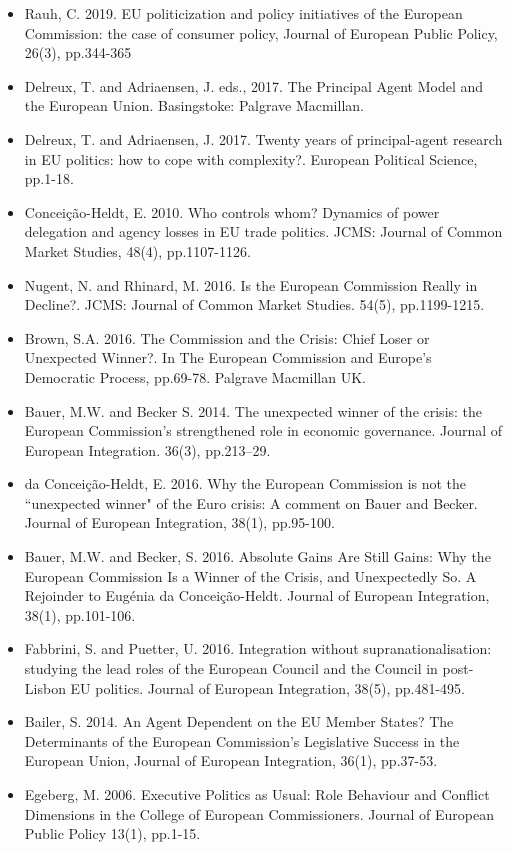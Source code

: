 \begin{itemize}
	\item Rauh, C. 2019. EU politicization and policy initiatives of the European Commission: the case of consumer policy, Journal of European Public Policy, 26(3), pp.344-365
	\item Delreux, T. and Adriaensen, J. eds., 2017. The Principal Agent Model and the European Union. Basingstoke: Palgrave Macmillan.
	\item Delreux, T. and Adriaensen, J. 2017. Twenty years of principal-agent research in EU politics: how to cope with complexity?. European Political Science, pp.1-18.
	\item Concei\c{c}\~{a}o-Heldt, E. 2010. Who controls whom? Dynamics of power delegation and agency losses in EU trade politics. JCMS: Journal of Common Market Studies, 48(4), pp.1107-1126.
	\item Nugent, N. and Rhinard, M. 2016. Is the European Commission Really in Decline?. JCMS: Journal of Common Market Studies. 54(5), pp.1199-1215.
	\item Brown, S.A. 2016. The Commission and the Crisis: Chief Loser or Unexpected Winner?. In The European Commission and Europe's Democratic Process, pp.69-78. Palgrave Macmillan UK.
	\item Bauer, M.W. and Becker S. 2014. The unexpected winner of the crisis: the European Commission’s strengthened role in economic governance. Journal of European Integration. 36(3), pp.213–29.
	\item da Concei\c{c}\~{a}o-Heldt, E. 2016. Why the European Commission is not the ``unexpected winner" of the Euro crisis: A comment on Bauer and Becker. Journal of European Integration, 38(1), pp.95-100.
	\item Bauer, M.W. and Becker, S. 2016. Absolute Gains Are Still Gains: Why the European Commission Is a Winner of the Crisis, and Unexpectedly So. A Rejoinder to Eugénia da Concei\c{c}\~{a}o-Heldt. Journal of European Integration, 38(1), pp.101-106.
	\item Fabbrini, S. and Puetter, U. 2016. Integration without supranationalisation: studying the lead roles of the European Council and the Council in post-Lisbon EU politics. Journal of European Integration, 38(5), pp.481-495.
	\item Bailer, S. 2014. An Agent Dependent on the EU Member States? The Determinants of the European Commission’s Legislative Success in the European Union, Journal of European Integration, 36(1), pp.37-53.
	\item Egeberg, M. 2006. Executive Politics as Usual: Role Behaviour and Conflict Dimensions in the College of European Commissioners. Journal of European Public Policy 13(1), pp.1-15.

\end{itemize}
